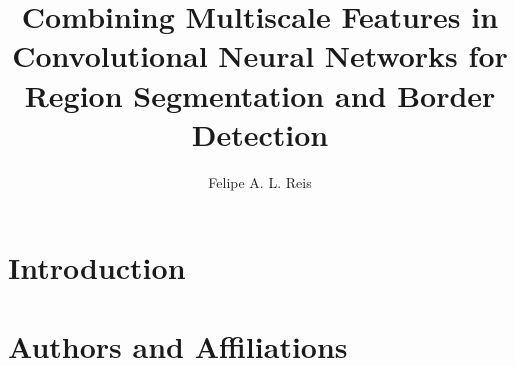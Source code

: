 \documentclass[sigchi]{acmart}
\begin{document}
\newcommand{\myFPS}{44.8 }
\newcommand{\sourceOwn}{\normalsize\par\textbf{Source: author's own}}

\title[Combining Multiscale Features in CNNs for Region Segmentation and Border Detection]{Combining Multiscale Features in Convolutional Neural Networks for Region Segmentation and Border Detection}

\author{Felipe A. L. Reis}

\begin{abstract}

\end{abstract}



\maketitle

\section{Introduction}









\section{Authors and Affiliations}



\end{document}
